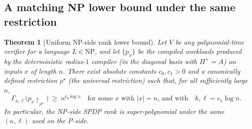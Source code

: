 \documentclass[12pt]{article}
\newtheorem{theorem}{Theorem}
\theoremstyle{definition}
\theoremstyle{definition}
\theoremstyle{remark}
\theoremstyle{remark}
\begin{document}
\subsection{A matching NP lower bound under the same restriction}

\begin{theorem}[Uniform NP-side rank lower bound]\label{thm:np-restriction}\label{thm:np-uniform-lb}
Let $V$ be any polynomial-time verifier for a language $L\in\mathrm{NP}$, and let
$\{p_{x}\}$ be the compiled workloads produced by the deterministic radius-$1$ compiler
(in the diagonal basis with $\Pi^+=A$) on inputs $x$ of length $n$. There exist absolute
constants $c_0,c_1>0$ and a canonically defined restriction $\rho^\star$ (the universal
restriction) such that, for all sufficiently large $n$,
\[
\Gamma_{\kappa,\ell}\big(p_{x}\!\upharpoonright_{\rho^\star}\big)\ \ge\ n^{c_0\log n}
\quad\text{for some $x$ with $|x|=n$, and with}\quad
k,\ell=c_1\log n.
\]
In particular, the NP-side SPDP rank is super-polynomial under the same $(\kappa,\ell)$ used on the P-side.
\end{theorem}
\end{document}
